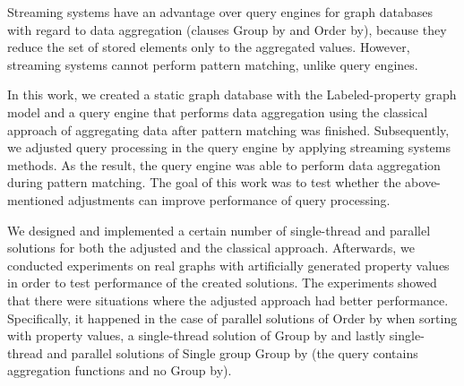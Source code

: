 \documentclass[12pt]{report}
\begin{document}

Streaming systems have an advantage over query engines for graph databases with regard to data aggregation (clauses Group by and Order by), because they reduce the set of stored elements only to the aggregated values.
However, streaming systems cannot perform pattern matching, unlike query engines.

In this work, we created a static graph database with the Labeled-property graph model and a query engine that performs data aggregation using the classical approach of aggregating data after pattern matching was finished.
Subsequently, we adjusted query processing in the query engine by applying streaming systems methods. 
As the result, the query engine was able to perform data aggregation during pattern matching.  
The goal of this work was to test whether the above-mentioned adjustments can improve performance of query processing.

We designed and implemented a certain number of single-thread and parallel solutions for both the adjusted and the classical approach.
Afterwards, we conducted experiments on real graphs with artificially generated property values in order to test performance of the created solutions.
The experiments showed that there were situations where the adjusted approach had better performance.
Specifically, it happened in the case of parallel solutions of Order by when sorting with property values, a single-thread solution of Group by and lastly single-thread and parallel solutions of Single group Group by (the query contains aggregation functions and no Group by).
\end{document}
